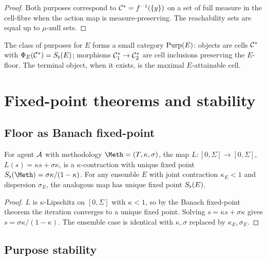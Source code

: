 \begin{proof}
Both purposes correspond to $\mathcal{C}^*=f^{-1}(\{y\})$ on a set of
full measure in the cell-fibre when the action map is measure-preserving.
The reachability sets are equal up to $\mu$-null sets.
\end{proof}

\begin{remark}\label{rem:cat-purpose}
The class of purposes for $E$ forms a small category $\operatorname{Purp}(E)$: objects
are cells $\mathcal{C}^*$ with $\Phi_E(\mathcal{C}^*)=S_{\flat}(E)$; morphisms
$\mathcal{C}^*_1\to\mathcal{C}^*_2$ are cell inclusions preserving the $E$-floor. The
terminal object, when it exists, is the maximal $E$-attainable cell.
\end{remark}

\section{Fixed-point theorems and stability}
\label{sec:ch03-stability}

\subsection{Floor as Banach fixed-point}

\begin{theorem}\label{thm:floor-fp}
For agent $\mathcal{A}$ with methodology $\Meth=(T,\kappa,\sigma)$, the map
$L:[0,\Sigma]\to[0,\Sigma]$, $L(s)=\kappa s+\sigma\kappa$, is a
$\kappa$-contraction with unique fixed point $\Sfloor(\Meth)=\sigma\kappa/(1-\kappa)$.
For any ensemble $E$ with joint contraction $\kappa_E<1$ and dispersion
$\sigma_E$, the analogous map has unique fixed point $S_{\flat}(E)$.
\end{theorem}

\begin{proof}
$L$ is $\kappa$-Lipschitz on $[0,\Sigma]$ with $\kappa<1$, so by the
Banach fixed-point theorem \citep{banach1922} the iteration converges to a
unique fixed point. Solving $s=\kappa s+\sigma\kappa$ gives
$s=\sigma\kappa/(1-\kappa)$. The ensemble case is identical with
$\kappa,\sigma$ replaced by $\kappa_E,\sigma_E$.
\end{proof}

\subsection{Purpose stability}

